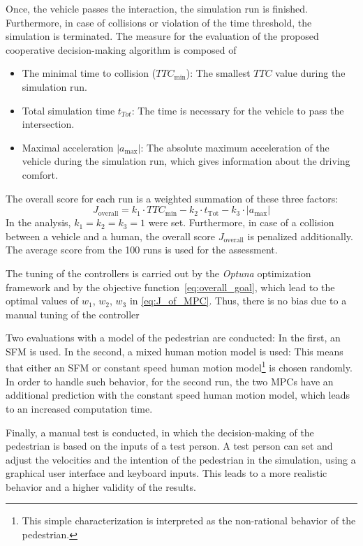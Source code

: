 \documentclass[conference]{IEEEtran}
\begin{document}
	
	Once, the vehicle passes the interaction, the simulation run is finished. Furthermore, in case of collisions or violation of the time threshold, the simulation is terminated. The measure for the evaluation of the proposed cooperative decision-making algorithm is composed of 
	\begin{itemize}
		\item The minimal time to collision ($TTC_\mathrm{min}$): The smallest $TTC$ value during the simulation run.
		\item Total simulation time $t_{Tot}$: The time is necessary for the vehicle to pass the intersection.
		\item Maximal acceleration $\left|a_\mathrm{max}\right|$: The absolute maximum acceleration of the vehicle during the simulation run, which gives information about the driving comfort.
	\end{itemize}
	The overall score for each run is a weighted summation of these three factors:
	\begin{equation} \label{eq:overall_goal}
		J_\mathrm{overall}=k_{1} \cdot TTC_\mathrm{min} - k_{2} \cdot t_\mathrm{Tot} - k_{3} \cdot \left|a_\mathrm{max}\right|
	\end{equation}
	In the analysis, $k_{1}=k_{2}=k_{3}=1$ were set. Furthermore, in case of a collision between a vehicle and a human, the overall score $J_\mathrm{overall}$ is penalized additionally. The average score from the 100 runs is used for the assessment. 
	
	The tuning of the controllers is carried out by the \textit{Optuna} optimization framework \cite{2019_OptunaNextgenerationHyperparameter_akiba} and by the objective function~\eqref{eq:overall_goal}, which lead to the optimal values of $w_{1}$, $w_{2}$, $w_{3}$ in \eqref{eq:J_of_MPC}. Thus, there is no bias due to a manual tuning of the controller
	
	Two evaluations with a model of the pedestrian are conducted: In the first, an SFM is used. In the second, a mixed human motion model is used: This means that either an SFM or constant speed human motion model\footnote{This simple characterization is interpreted as the non-rational behavior of the pedestrian.} is chosen randomly. In order to handle such behavior, for the second run, the two MPCs have an additional prediction with the constant speed human motion model, which leads to an increased computation time.
	
	Finally, a manual test is conducted, in which the decision-making of the pedestrian is based on the inputs of a test person. A test person can set and adjust the velocities and the intention of the pedestrian in the simulation, using a graphical user interface and keyboard inputs. This leads to a more realistic behavior and a higher validity of the results.
\end{document}
